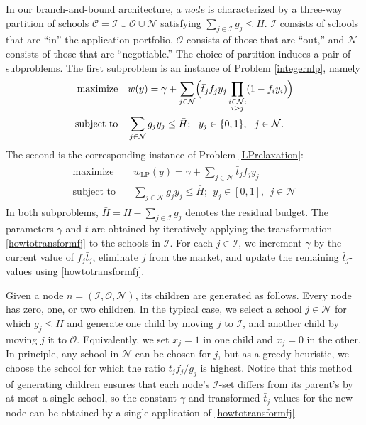 \documentclass[12pt]{article} %
\theoremstyle{definition}
\theoremstyle{definition}
\begin{document}
In our branch-and-bound architecture, a \emph{node} is characterized by a three-way partition of schools $\mathcal{C}= \mathcal{I} \cup \mathcal{O} \cup \mathcal{N}$ satisfying $\sum_{j \in \mathcal{I}} g_j \leq H$. $\mathcal{I}$ consists of schools that are ``in'' the application portfolio, $\mathcal{O}$ consists of those that are ``out,'' and $\mathcal{N}$ consists of those that are ``negotiable.'' 
The choice of partition induces a pair of subproblems. The first subproblem is an instance of Problem \ref{integernlp}, namely
\begin{align} \label{nodenlpsubproblem}
\begin{split}
\text{maximize}\quad &  w(y) = \gamma + \sum_{j \in \mathcal{N}} \Bigl( \bar t_j f_j  y_j \prod_{\substack{i \in \mathcal{N}:\\i > j}} (1 - f_{i} y_i) \Bigr)\\
\text{subject to}\quad & \sum_{j \in \mathcal{N}} g_j y_j \leq \bar H; ~~ y_j \in \{0, 1\},~~j \in \mathcal{N}.
\end{split}
\end{align}
The second is the corresponding instance of Problem \ref{LPrelaxation}:
\begin{align} \label{nodelprelaxation}
\begin{split}
\text{maximize}\quad &  w_{\mathrm{LP}}(y)= \gamma + \sum_{j \in \mathcal{N}}  \bar t_j f_j  y_j \\
\text{subject to}\quad & \sum_{j \in \mathcal{N}} g_j y_j \leq \bar H; ~~ y_j \in [0, 1],~~j \in \mathcal{N}
\end{split}
\end{align}
In both subproblems, $\bar H = H - \sum_{j\in \mathcal{I}} g_j$ denotes the residual budget. The parameters $\gamma$ and $\bar t$ are obtained by iteratively applying the transformation \eqref{howtotransformfj} to the schools in $\mathcal{I}$. For each $j\in \mathcal{I}$,  we increment $\gamma$ by the current value of $f_j \bar t_j$, eliminate $j$ from the market, and update the remaining $\bar t_j$-values using \eqref{howtotransformfj}.

Given a node $n  = (\mathcal{I}, \mathcal{O}, \mathcal{N})$, its children are generated as follows. Every node has zero, one, or two children. In the typical case, we select a school $j \in \mathcal{N}$ for which $g_j \leq \bar H$ and generate one child by moving $j$ to $\mathcal{I}$, and another child by moving $j$ it to $\mathcal{O}$. Equivalently, we set $x_j = 1$ in one child and $x_j = 0$ in the other. In principle, any school in $\mathcal{N}$ can be chosen for $j$, but as a greedy heuristic, we choose the school for which the ratio $t_j f_j / g_j$ is highest.  Notice that this method of generating children ensures that each node's $\mathcal{I}$-set differs from its parent's by at most a single school, so the constant $\gamma$ and transformed $\bar t_j$-values for the new node can be obtained by a single application of \eqref{howtotransformfj}. 
\end{document}
